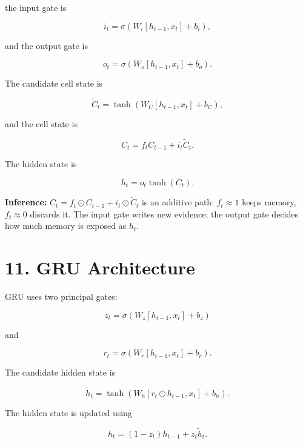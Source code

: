 \documentclass[10pt]{article}
\begin{document}
the input gate is

\[
i_t=\sigma(W_i[h_{t-1},x_t]+b_i),
\]

and the output gate is

\[
o_t=\sigma(W_o[h_{t-1},x_t]+b_o).
\]

The candidate cell state is

\[
\tilde{C}_t=
\tanh(W_C[h_{t-1},x_t]+b_C),
\]

and the cell state is

\[
C_t=f_tC_{t-1}+i_t\tilde{C}_t.
\]

The hidden state is

\[
h_t=o_t\tanh(C_t).
\]

\begin{center}
\end{center}


\textbf{Inference:} $C_t=f_t\odot C_{t-1}+i_t\odot\tilde{C}_t$ is an additive
path: $f_t\approx1$ keeps memory, $f_t\approx0$ discards it. The input gate
writes new evidence; the output gate decides how much memory is exposed as
$h_t$.

\section*{11. GRU Architecture}

GRU uses two principal gates:

\[
z_t=\sigma(W_z[h_{t-1},x_t]+b_z)
\]

and

\[
r_t=\sigma(W_r[h_{t-1},x_t]+b_r).
\]

The candidate hidden state is

\[
\tilde{h}_t=
\tanh(W_h[r_t\odot h_{t-1},x_t]+b_h).
\]

The hidden state is updated using

\[
h_t=(1-z_t)h_{t-1}+z_t\tilde{h}_t.
\]

\begin{center}
\end{center}
\end{document}
